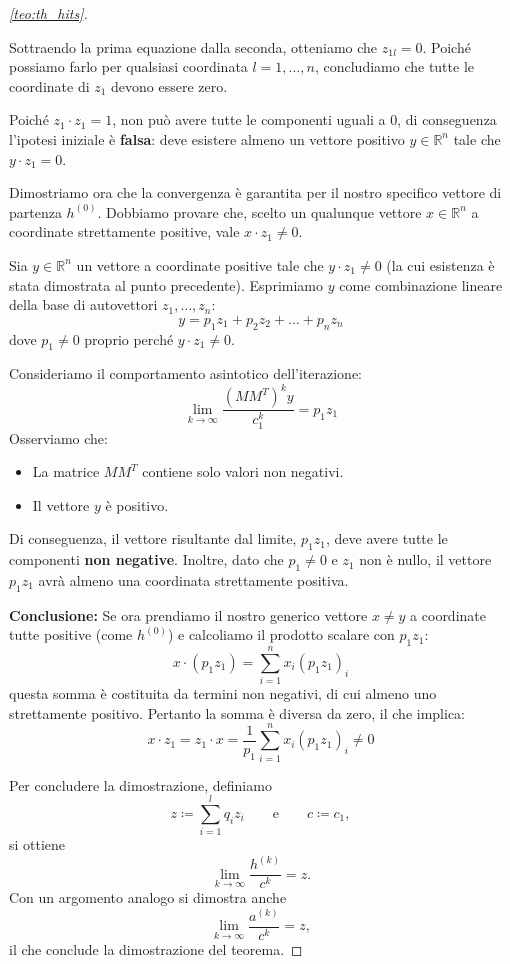 \begin{proof}[\autoref{teo:th_hits}]
\begin{description}
        Sottraendo la prima equazione dalla seconda, otteniamo che $z_{1l} = 0$.
        Poiché possiamo farlo per qualsiasi coordinata $l = 1, \dots, n$, concludiamo che tutte le coordinate di $z_1$ devono essere zero.

        Poiché $z_1 \cdot z_1 = 1$, non può avere tutte le componenti uguali a 0, di conseguenza l'ipotesi iniziale è \textbf{falsa}: deve esistere almeno un vettore positivo $y \in \mathbb{R}^n$ tale che $y \cdot z_1 = 0$.

        \item[Universalità] Dimostriamo ora che la convergenza è garantita per il nostro specifico vettore di partenza $h^{(0)}$. Dobbiamo provare che, scelto un qualunque vettore $x \in \mathbb{R}^n$ a coordinate strettamente positive, vale $x \cdot z_1 \neq 0$.

        Sia $y \in \mathbb{R}^n$ un vettore a coordinate positive tale che $y \cdot z_1 \neq 0$ (la cui esistenza è stata dimostrata al punto precedente). Esprimiamo $y$ come combinazione lineare della base di autovettori $z_1, \dots, z_n$:
        \[
        y = p_1 z_1 + p_2 z_2 + \dots + p_n z_n
        \]
        dove $p_1 \neq 0$ proprio perché $y \cdot z_1 \neq 0$.

        Consideriamo il comportamento asintotico dell'iterazione:
        \[
        \lim_{k \to \infty} \frac{(M M^T)^k y}{c_1^k} = p_1 z_1
        \]
        Osserviamo che:
        \begin{itemize}
            \item La matrice $M M^T$ contiene solo valori non negativi.
            \item Il vettore $y$ è positivo.
        \end{itemize}
        Di conseguenza, il vettore risultante dal limite, $p_1 z_1$, deve avere tutte le componenti \textbf{non negative}. Inoltre, dato che $p_1 \neq 0$ e $z_1$ non è nullo, il vettore $p_1 z_1$ avrà almeno una coordinata strettamente positiva.

        \textbf{Conclusione:} Se ora prendiamo il nostro generico vettore $x \neq y$ a coordinate tutte positive (come $h^{(0)}$) e calcoliamo il prodotto scalare con $p_1 z_1$:
        \[
        x \cdot (p_1 z_1) = \sum_{i=1}^n x_i (p_1 z_1)_i
        \]
        questa somma è costituita da termini non negativi, di cui almeno uno strettamente positivo.
        Pertanto la somma è diversa da zero, il che implica:
        \[
        x \cdot z_1 = z_1 \cdot x = \frac{1}{p_1}\sum_{i=1}^n x_i (p_1 z_1)_i \neq 0
        \]
    \end{description}
    Per concludere la dimostrazione, definiamo
    \[ z \coloneqq \sum_{i=1}^{l} q_i z_i \qquad\text{e}\qquad c\coloneqq c_1, \]
    si ottiene
    \[
    \lim_{k\to\infty}\frac{h^{(k)}}{c^k}=z.
    \]
    Con un argomento analogo si dimostra anche
    \[
    \lim_{k\to\infty}\frac{a^{(k)}}{c^k}=z,
    \]
    il che conclude la dimostrazione del teorema.
\end{proof}

